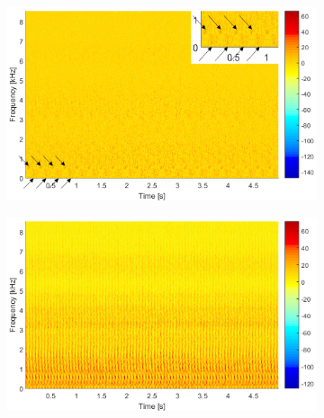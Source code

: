 \begin{figure}[!ht]
\begin{subfigure}[b]{0.49\textwidth}
        \centering
        \captionsetup{skip=0.01pt}
        \caption{}
        \includegraphics[width=\textwidth]{wykresy/chapter_application/semi_blind/mapkaL212_log_4.png}
        \label{fig:chapter7/semi_blind/mapka_L212_4}
    \end{subfigure}
    \begin{subfigure}[b]{0.49\textwidth}
        \centering
        \captionsetup{skip=0.01pt}
        \caption{}
        \includegraphics[width=\textwidth]{wykresy/chapter_application/semi_blind/mapkaL212_log_16.png}
        \label{fig:chapter7/semi_blind/mapka_L212_16}
    \end{subfigure}
    \caption{Score matrices for fault frequency 4.2~Hz (a) and 16.61~Hz (b). The weighted spectrograms in the log scale for fault frequency 4.2~Hz (c) and 16.61~Hz (d). }\label{fig:chapter7/semi_blind/score_real}
%
    \centering
    \begin{subfigure}[b]{0.49\textwidth}
        \centering
        \captionsetup{skip=0.01pt}

\end{subfigure}
\end{figure}

